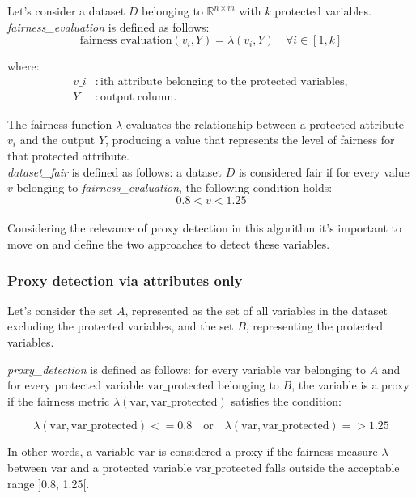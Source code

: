 \documentclass[12pt,a4paper,openright,twoside]{book}
\begin{document}
Let's consider a dataset \( D \) belonging to \( \mathbb{R}^{n \times m} \) with \( k \) protected variables. \\

\textit{fairness\_evaluation} is defined as follows:
\[
\text{fairness\_evaluation}(v_i, Y) = \lambda(v_i, Y) \quad \forall i \in [1, k]
\]

where:
\begin{align*}
v\_i & : \text{ith attribute belonging to the protected variables}, \\
Y & : \text{output column}.
\end{align*}

The fairness function \( \lambda \) evaluates the relationship between a protected attribute \( v_i \) and the output \( Y \), producing a value that represents the level of fairness for that protected attribute. \\

\textit{dataset\_fair} is defined as follows: a dataset \( D \) is considered fair if for every value \( v \) belonging to \textit{fairness\_evaluation}, the following condition holds:
\[ 0.8  < v < 1.25 \] \\

Considering the relevance of proxy detection in this algorithm it's important to move on and define the two approaches to detect these variables. \\

\subsubsection{Proxy detection via attributes only}
Let's consider the set \( A \), represented as the set of all variables in the dataset excluding the protected variables, and the set \( B \), representing the protected variables.

\textit{proxy\_detection} is defined as follows: for every variable \( \text{var} \) belonging to \( A \) and for every protected variable \( \text{var\_protected} \) belonging to \( B \), the variable is a proxy if the fairness metric \( \lambda(\text{var}, \text{var\_protected}) \) satisfies the condition:

\[
\lambda(\text{var}, \text{var\_protected}) <= 0.8 \quad \text{or} \quad \lambda(\text{var}, \text{var\_protected}) => 1.25
\]

In other words, a variable \( \text{var} \) is considered a proxy if the fairness measure \( \lambda \) between \( \text{var} \) and a protected variable \( \text{var\_protected} \) falls outside the acceptable range ]0.8, 1.25[. \\
\end{document}

